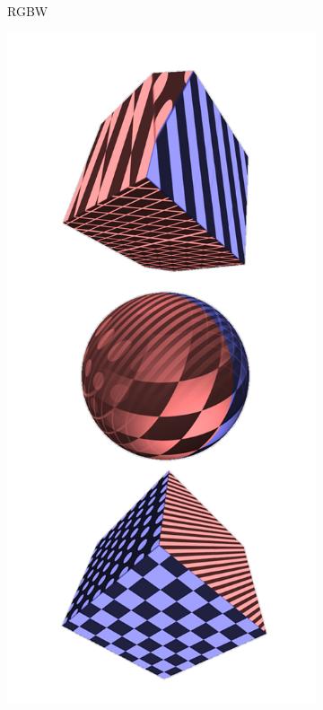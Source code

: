 \documentclass{l4proj}
\begin{document}
\begin{figure}
\begin{subfigure}[b]{0.32\textwidth}
    \caption{
      RGBW
    }
    \label{fig:tex1}
  \end{subfigure}
  \begin{subfigure}[b]{0.32\textwidth}
    \includegraphics[width=\textwidth]{images/textures/pattern-direction.png}

\end{subfigure}
\end{figure}
\end{document}
